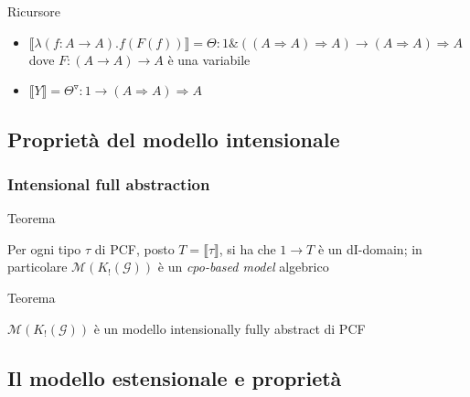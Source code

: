 \documentclass{beamer}
\begin{document}
\begin{frame}
	
	\begin{block}{Ricursore}
	
		\begin{itemize}
			\item $\llbracket \lambda (f : A \rightarrow A).f(F(f)) \rrbracket = \Theta:1\&((A\Rightarrow A) \Rightarrow A) \rightarrow (A\Rightarrow A) \Rightarrow A$ dove $F:(A\rightarrow A)\rightarrow A$ è una variabile
			\item $\llbracket Y \rrbracket = \Theta ^\triangledown : 1 \rightarrow (A\Rightarrow A) \Rightarrow A$
		\end{itemize}
		
	\end{block}

	
\end{frame}






\subsection{Proprietà del modello intensionale}

\begin{frame}
	
	\frametitle{Intensional full abstraction}
	
	
	\begin{block}{Teorema}
		
		Per ogni tipo $\tau$ di PCF, posto $T= \llbracket \tau \rrbracket$, si ha che $1 \rightarrow T$ è un dI-domain;
		in particolare $\mathcal{M}(K_! (\mathcal{G}) )$ è un \emph{cpo-based model} algebrico
		
	\end{block}
	
	
	\begin{block}{Teorema}
		
		$\mathcal{M}(K_! (\mathcal{G}) )$ è un modello intensionally fully abstract di PCF
		
	\end{block}
	
	
\end{frame}




\subsection{Il modello estensionale e proprietà}
\end{document}
